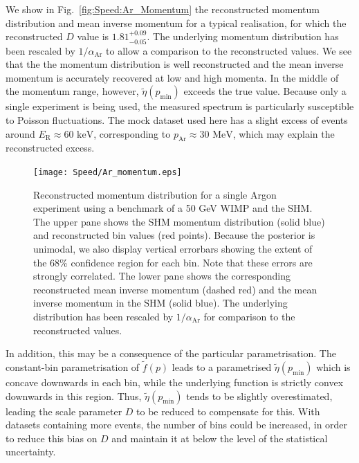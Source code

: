 We show in Fig.\ \ref{fig:Speed:Ar_Momentum} the reconstructed momentum distribution and mean inverse momentum for a typical realisation, for which the reconstructed \(D\) value is \(1.81_{-0.05}^{+0.09}\). The underlying momentum distribution has been rescaled by \(1/\alpha_\textrm{Ar}\) to allow a comparison to the reconstructed values. We see that the the momentum distribution is well reconstructed and the mean inverse momentum is accurately recovered at low and high momenta. In the middle of the momentum range, however, \(\tilde{\eta}(p_\textrm{min})\) exceeds the true value. Because only a single experiment is being used, the measured spectrum is particularly susceptible to Poisson fluctuations. The mock dataset used here has a slight excess of events around \(E_\textrm{R} \approx 60 \textrm{ keV}\), corresponding to \(p_\textrm{Ar} \approx 30 \textrm{ MeV}\), which may explain the reconstructed excess.

 \begin{figure}[t]
\centering
\texttt{[image: Speed/Ar\_momentum.eps]}
\caption[Reconstructed momentum distribution for a single Argon experiment using a benchmark of a 50 GeV WIMP and the SHM]{Reconstructed momentum distribution for a single Argon experiment using a benchmark of a 50 GeV WIMP and the SHM.  The upper pane shows the SHM momentum distribution (solid blue) and reconstructed bin values (red points). Because the posterior is unimodal, we also display vertical errorbars showing the extent of the 68\% confidence region for each bin. Note that these errors are strongly correlated. The lower pane shows the corresponding reconstructed mean inverse momentum (dashed red) and the mean inverse momentum in the SHM (solid blue). The underlying distribution has been rescaled by \(1/\alpha_{\textrm{Ar}}\) for comparison to the reconstructed values.}
  \label{fig:Speed/Ar_Momentum}
\end{figure}


In addition, this may be a consequence of the particular parametrisation. The constant-bin parametrisation of \(\tilde{f}(p)\) leads to a parametrised \(\tilde{\eta}(p_\textrm{min})\) which is concave downwards in each bin, while the underlying function is strictly convex downwards in this region. Thus, \(\tilde{\eta}(p_\textrm{min})\) tends to be slightly overestimated, leading the scale parameter \(D\) to be reduced to compensate for this. With datasets containing more events, the number of bins could be increased, in order to reduce this bias on \(D\) and maintain it at below the level of the statistical uncertainty.


